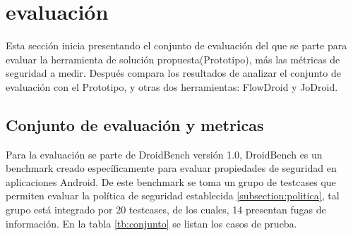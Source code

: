 \section{evaluación}
\label{sec:eval}
Esta sección inicia presentando el conjunto de evaluación del que se parte para
evaluar la herramienta de solución propuesta(Prototipo), más las métricas de
seguridad a medir.
Después compara los resultados de analizar el conjunto de evaluación con
el Prototipo, y otras dos herramientas: FlowDroid y JoDroid.

\subsection{Conjunto de evaluación y metricas}
Para la evaluación se parte de DroidBench versión
1.0\cite{DroidBenchBenchmarks}, DroidBench es un benchmark creado
específicamente para evaluar propiedades de seguridad en aplicaciones Android.
De este benchmark se toma un grupo de testcases que permiten evaluar la política
de seguridad establecida \ref{subsection:politica}, tal grupo está integrado por
20 testcases, de los cuales, 14 presentan fugas de información. En la tabla
\ref{tb:conjunto} se listan los casos de prueba.
